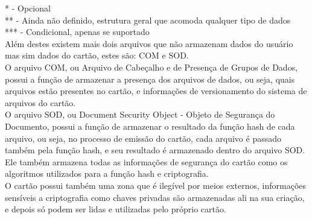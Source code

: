 \documentclass{article}
\begin{document}
\begin{justify}
			\hspace*{1.5cm} * - Opcional\\
			\hspace*{2cm} ** - Ainda não definido, estrutura geral que acomoda qualquer tipo de dados\\
			\hspace*{2cm} *** - Condicional, apenas se suportado\\
			
			\hspace*{2cm}Além destes existem mais dois arquivos que não armazenam dados do usuário mas sim dados do cartão, estes são: COM e SOD.\\
			\hspace*{2cm} O arquivo COM, ou Arquivo de Cabeçalho e de Presença de Grupos de Dados, possui a função de armazenar a presença dos arquivos de dados, ou seja, quais arquivos estão presentes no cartão, e informações de versionamento do sistema de arquivos do cartão. \\
			\hspace*{2cm} O arquivo SOD, ou Document Security Object - Objeto de Segurança do Documento, possui a função de armazenar o resultado da função hash de cada arquivo, ou seja, no processo de emissão do cartão, cada arquivo é passado também pela função hash, e seu resultado é armazenado dentro do arquivo SOD. Ele também armazena todas as informações de segurança do cartão como os algoritmos utilizados para a função hash e criptografia.\\
			\hspace*{2cm} O cartão possui também uma zona que é ilegível por meios externos, informações sensíveis a criptografia como chaves privadas são armazenadas ali na sua criação, e depois só podem ser lidas e utilizadas pelo próprio cartão.
		\end{justify}
\end{document}
